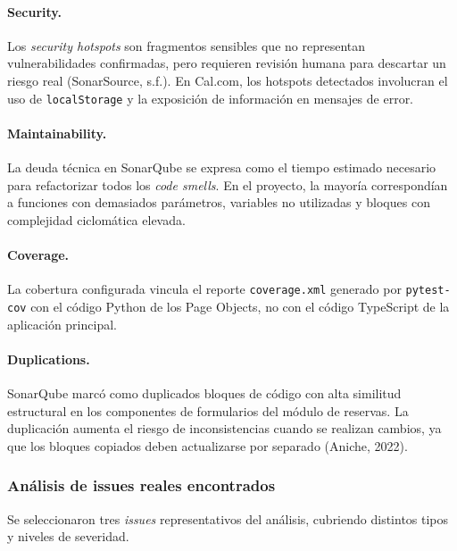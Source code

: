 \documentclass{article}
\begin{document}
\paragraph{Security.}
Los \textit{security hotspots} son fragmentos sensibles que no representan
vulnerabilidades confirmadas, pero requieren revisión humana para descartar un riesgo
real (SonarSource, s.f.). En Cal.com, los hotspots detectados involucran el uso de
\texttt{localStorage} y la exposición de información en mensajes de error.

\paragraph{Maintainability.}
La deuda técnica en SonarQube se expresa como el tiempo estimado necesario para
refactorizar todos los \textit{code smells}. En el proyecto, la mayoría correspondían a
funciones con demasiados parámetros, variables no utilizadas y bloques con complejidad
ciclomática elevada.

\paragraph{Coverage.}
La cobertura configurada vincula el reporte \texttt{coverage.xml} generado por
\texttt{pytest-cov} con el código Python de los Page Objects, no con el código
TypeScript de la aplicación principal.

\paragraph{Duplications.}
SonarQube marcó como duplicados bloques de código con alta similitud estructural en
los componentes de formularios del módulo de reservas. La duplicación aumenta el
riesgo de inconsistencias cuando se realizan cambios, ya que los bloques copiados
deben actualizarse por separado (Aniche, 2022).

\subsubsection{Análisis de issues reales encontrados}

Se seleccionaron tres \textit{issues} representativos del análisis, cubriendo distintos
tipos y niveles de severidad.
\end{document}
